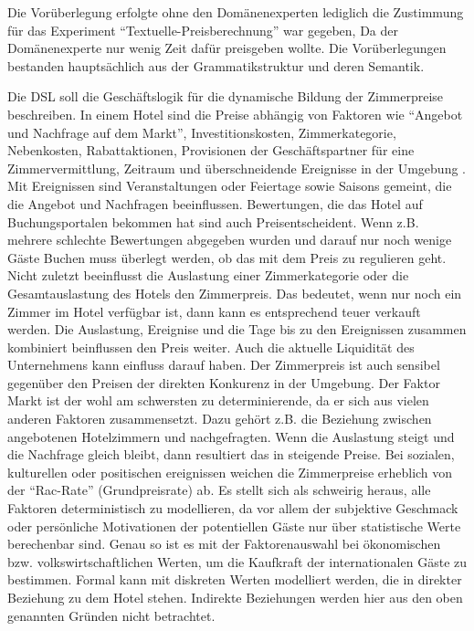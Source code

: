 \documentclass[11pt,english,ngerman, headsepline]{scrreprt}
\begin{document}
Die Vorüberlegung erfolgte ohne den Domänenexperten lediglich die Zustimmung
für das Experiment ``Textuelle-Preisberechnung'' war gegeben, Da der
Domänenexperte nur wenig Zeit dafür preisgeben wollte. Die Vorüberlegungen
bestanden hauptsächlich aus der Grammatikstruktur und deren Semantik. 

Die DSL soll die Geschäftslogik für die dynamische Bildung der Zimmerpreise
beschreiben. In einem Hotel sind die Preise abhängig von Faktoren wie
``Angebot und Nachfrage auf dem Markt'', Investitionskosten, Zimmerkategorie,
Nebenkosten, Rabattaktionen, Provisionen der Geschäftspartner für eine
Zimmervermittlung, Zeitraum und überschneidende Ereignisse in der Umgebung
\cite[S. 44]{hahn1993tourismuspsychologie}. Mit Ereignissen sind Veranstaltungen
oder Feiertage sowie Saisons gemeint, die die Angebot und Nachfragen beeinflussen. Bewertungen, die
das Hotel auf Buchungsportalen bekommen hat sind auch Preisentscheident. Wenn
z.B. mehrere schlechte Bewertungen abgegeben wurden und darauf nur noch wenige
Gäste Buchen muss überlegt werden, ob das mit dem Preis zu regulieren geht.
Nicht zuletzt beeinflusst die Auslastung einer Zimmerkategorie oder die
Gesamtauslastung des Hotels den Zimmerpreis. Das bedeutet, wenn nur noch ein
Zimmer im Hotel verfügbar ist, dann kann es entsprechend teuer verkauft werden.
Die Auslastung, Ereignise und die Tage bis zu den Ereignissen zusammen
kombiniert beinflussen den Preis weiter. Auch die aktuelle Liquidität des
Unternehmens kann einfluss darauf haben. Der Zimmerpreis ist auch sensibel
gegenüber den Preisen der direkten Konkurenz in der Umgebung.
Der Faktor Markt ist der wohl am schwersten zu determinierende, da er sich aus
vielen anderen Faktoren zusammensetzt. Dazu gehört z.B. die Beziehung zwischen
angebotenen Hotelzimmern und nachgefragten. Wenn die Auslastung steigt und die
Nachfrage gleich bleibt, dann resultiert das in steigende Preise.
Bei sozialen, kulturellen oder positischen ereignissen weichen die Zimmerpreise
erheblich von der ``Rac-Rate'' (Grundpreisrate) ab.
Es stellt sich als schweirig heraus, alle Faktoren deterministisch zu
modellieren, da vor allem der subjektive Geschmack oder persönliche Motivationen
der potentiellen Gäste nur über statistische Werte berechenbar sind. Genau so
ist es mit der Faktorenauswahl bei ökonomischen bzw. volkswirtschaftlichen
Werten, um die Kaufkraft der internationalen Gäste zu bestimmen.
Formal kann mit diskreten Werten modelliert werden, die in direkter Beziehung zu
dem Hotel stehen. Indirekte Beziehungen werden hier aus den oben genannten
Gründen nicht betrachtet.
\end{document}
